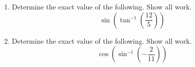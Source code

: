 



\begin{enumerate}


\item  Determine the exact value of the following.  Show all work.
  $$\sin\left(\tan^{-1}\left(\frac{12}{5}\right)\right)$$
  \vfill
\item Determine the exact value of the following.  Show all work.
  $$\cos\left(\sin^{-1}\left(-\frac{2}{11}\right)\right)$$
  \vfill
\end{enumerate}



